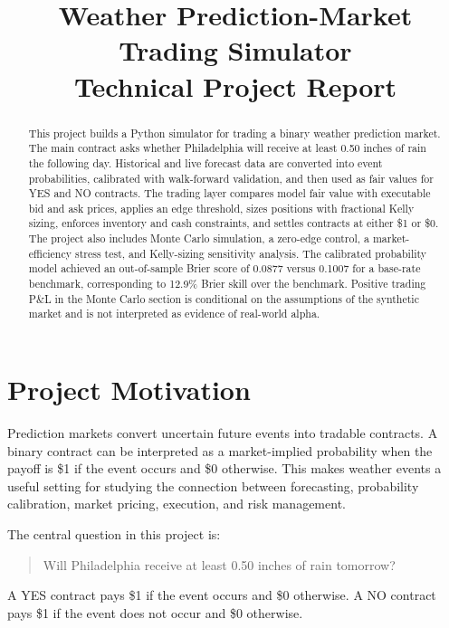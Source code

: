 \documentclass[11pt]{article}
\title{Weather Prediction-Market Trading Simulator\\\large Technical Project Report}
\author{}
\date{}
\begin{document}
\maketitle

\begin{abstract}
This project builds a Python simulator for trading a binary weather prediction market. The main contract asks whether Philadelphia will receive at least 0.50 inches of rain the following day. Historical and live forecast data are converted into event probabilities, calibrated with walk-forward validation, and then used as fair values for YES and NO contracts. The trading layer compares model fair value with executable bid and ask prices, applies an edge threshold, sizes positions with fractional Kelly sizing, enforces inventory and cash constraints, and settles contracts at either \$1 or \$0. The project also includes Monte Carlo simulation, a zero-edge control, a market-efficiency stress test, and Kelly-sizing sensitivity analysis. The calibrated probability model achieved an out-of-sample Brier score of 0.0877 versus 0.1007 for a base-rate benchmark, corresponding to 12.9\% Brier skill over the benchmark. Positive trading P\&L in the Monte Carlo section is conditional on the assumptions of the synthetic market and is not interpreted as evidence of real-world alpha.
\end{abstract}

\tableofcontents
\newpage

\section{Project Motivation}

Prediction markets convert uncertain future events into tradable contracts. A binary contract can be interpreted as a market-implied probability when the payoff is \$1 if the event occurs and \$0 otherwise. This makes weather events a useful setting for studying the connection between forecasting, probability calibration, market pricing, execution, and risk management.

The central question in this project is:

\begin{quote}
Will Philadelphia receive at least 0.50 inches of rain tomorrow?
\end{quote}

A YES contract pays \$1 if the event occurs and \$0 otherwise. A NO contract pays \$1 if the event does not occur and \$0 otherwise.
\end{document}
